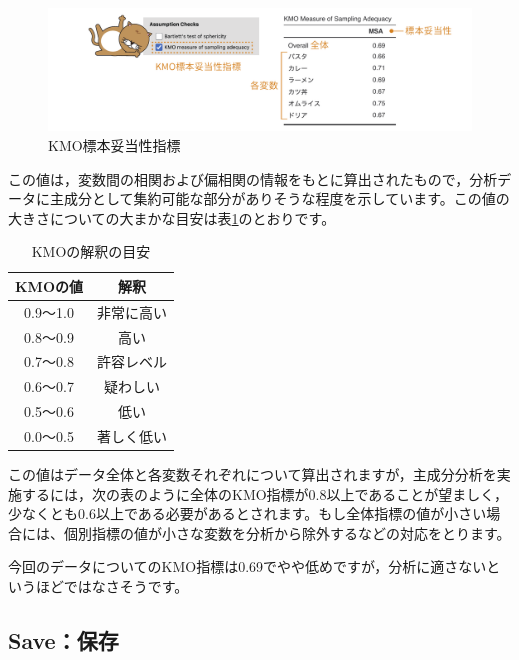 \documentclass[
  12pt,
  a5jpaper,
  lualatex, ja=standard]{bxjsbook}
\begin{document}
\begin{figure}[!ht]

{\centering \includegraphics[width=1\linewidth]{images/factor/pca-KMO} 

}

\caption{KMO標本妥当性指標}\label{fig:factor-pca-KMO}
\end{figure}

この値は，変数間の相関および偏相関の情報をもとに算出されたもので，分析データに主成分として集約可能な部分がありそうな程度を示しています。この値の大きさについての大まかな目安は表\ref{tab:factor-pca-KMO-table}のとおりです。

\begin{table}[H]

\caption{\label{tab:factor-pca-KMO-table}KMOの解釈の目安}
\centering
\begin{tabular}[t]{cc}
\toprule
KMOの値 & 解釈\\
\midrule
0.9〜1.0 & 非常に高い\\
0.8〜0.9 & 高い\\
0.7〜0.8 & 許容レベル\\
0.6〜0.7 & 疑わしい\\
0.5〜0.6 & 低い\\
0.0〜0.5 & 著しく低い\\
\bottomrule
\end{tabular}
\end{table}

この値はデータ全体と各変数それぞれについて算出されますが，主成分分析を実施するには，次の表のように全体のKMO指標が0.8以上であることが望ましく，少なくとも0.6以上である必要があるとされます。もし全体指標の値が小さい場合には、個別指標の値が小さな変数を分析から除外するなどの対応をとります。

今回のデータについてのKMO指標は0.69でやや低めですが，分析に適さないというほどではなさそうです。

\hypertarget{sub:factor-pca-save}{%
\subsection{Save：保存}\label{sub:factor-pca-save}}
\end{document}
